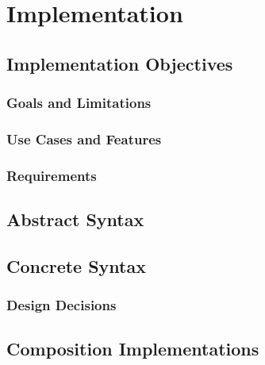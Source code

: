 \chapter{Implementation}

\section{Implementation Objectives}

\subsection{Goals and Limitations}

\subsection{Use Cases and Features}

\subsection{Requirements}

\section{Abstract Syntax}

\section{Concrete Syntax}

\subsection{Design Decisions}

\section{Composition Implementations}

